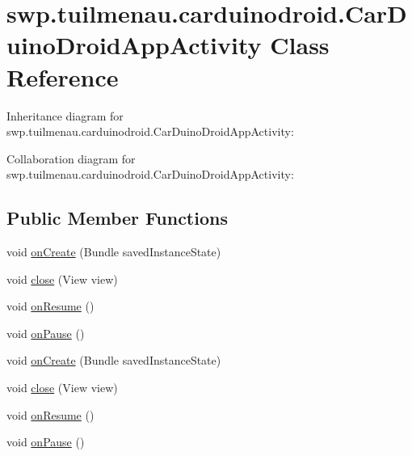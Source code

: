\hypertarget{classswp_1_1tuilmenau_1_1carduinodroid_1_1_car_duino_droid_app_activity}{}\section{swp.\+tuilmenau.\+carduinodroid.\+Car\+Duino\+Droid\+App\+Activity Class Reference}
\label{classswp_1_1tuilmenau_1_1carduinodroid_1_1_car_duino_droid_app_activity}


Inheritance diagram for swp.\+tuilmenau.\+carduinodroid.\+Car\+Duino\+Droid\+App\+Activity\+:


Collaboration diagram for swp.\+tuilmenau.\+carduinodroid.\+Car\+Duino\+Droid\+App\+Activity\+:
\subsection*{Public Member Functions}
\begin{DoxyCompactItemize}
\item 
void \hyperlink{classswp_1_1tuilmenau_1_1carduinodroid_1_1_car_duino_droid_app_activity_ae4a6735db6fc327f84d1fa9f32d1831c}{on\+Create} (Bundle saved\+Instance\+State)
\item 
void \hyperlink{classswp_1_1tuilmenau_1_1carduinodroid_1_1_car_duino_droid_app_activity_ac44cf73f0d563610f52c55989e0011b2}{close} (View view)
\item 
void \hyperlink{classswp_1_1tuilmenau_1_1carduinodroid_1_1_car_duino_droid_app_activity_aa34abf912f78a88c5c93368fc102e8da}{on\+Resume} ()
\item 
void \hyperlink{classswp_1_1tuilmenau_1_1carduinodroid_1_1_car_duino_droid_app_activity_a019fcfdb908e2fa556d735f477bf8b56}{on\+Pause} ()
\item 
void \hyperlink{classswp_1_1tuilmenau_1_1carduinodroid_1_1_car_duino_droid_app_activity_ae4a6735db6fc327f84d1fa9f32d1831c}{on\+Create} (Bundle saved\+Instance\+State)
\item 
void \hyperlink{classswp_1_1tuilmenau_1_1carduinodroid_1_1_car_duino_droid_app_activity_ac44cf73f0d563610f52c55989e0011b2}{close} (View view)
\item 
void \hyperlink{classswp_1_1tuilmenau_1_1carduinodroid_1_1_car_duino_droid_app_activity_aa34abf912f78a88c5c93368fc102e8da}{on\+Resume} ()
\item 
void \hyperlink{classswp_1_1tuilmenau_1_1carduinodroid_1_1_car_duino_droid_app_activity_a019fcfdb908e2fa556d735f477bf8b56}{on\+Pause} ()
\end{DoxyCompactItemize}


